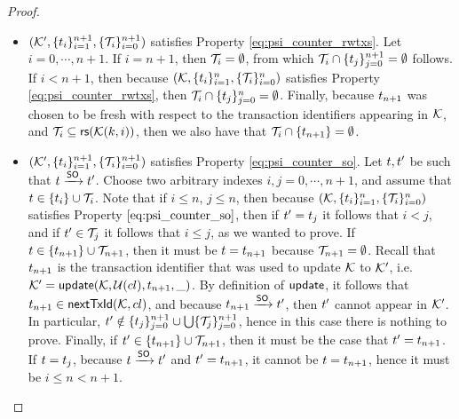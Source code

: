 \begin{proof}
\begin{itemize}
\begin{itemize}
\item $(\mathcal{K}', \{t_{i}\}_{i=1}^{n+1}, \{\mathcal{T}_{i}\}_{i=0}^{n+1})$ 
satisfies Property \eqref{eq:psi_counter_rwtxs}. Let $i =0, \cdots, n+1$. If $i = n+1$, then 
$\mathcal{T}_{i} = \emptyset$, from which $\mathcal{T}_{i} \cap \{t_{j}\}_{j=0}^{n+1} = \emptyset$ follows. If $i < n+1$, then 
because $(\mathcal{K}, \{t_{i}\}_{i=1}^{n}, \{\mathcal{T}_{i}\}_{i=0}^{n})$ 
satisfies Property \eqref{eq:psi_counter_rwtxs}, then $\mathcal{T}_{i} \cap \{t_{j}\}_{j=0}^{n} = \emptyset$. 
Finally, because $t_{n+1}$ was chosen to be fresh with respect to the transaction identifiers appearing in 
$\mathcal{K}$, and $\mathcal{T}_{i} \subseteq \mathsf{rs}(\mathcal{K}(k, i))$, then  we also have that $\mathcal{T}_{i} \cap \{t_{n+1}\} = \emptyset$. 
\item $(\mathcal{K}', \{t_{i}\}_{i=1}^{n+1}, \{\mathcal{T}_{i}\}_{i=0}^{n+1})$ satisfies Property \eqref{eq:psi_counter_so}. Let 
$t, t'$ be such that $t \xrightarrow{\mathsf{SO}} t'$. Choose two arbitrary indexes $i,j=0,\cdots, n+1$, 
and assume that $t \in \{t_{i}\} \cup \mathcal{T}_{i}$. Note that if $i \leq n$, $j \leq n$, then 
because $(\mathcal{K}, \{t_{i}\}_{i=1}^{n}, \{\mathcal{T}_{i}\}_{i=0}^{n})$ satisfies Property $\eqref{eq:psi_counter_so}$, then 
if $t' = t_{j}$ it follows that $i < j$, and if $t' \in \mathcal{T}_{j}$ it follows that $i \leq j$, as 
we wanted to prove. 
If $t \in \{t_{n+1}\} \cup \mathcal{T}_{n+1}$, then it must be $t = t_{n+1}$ because 
$\mathcal{T}_{n+1} = \emptyset$. Recall that $t_{n+1}$ is the transaction identifier that was used 
to update $\mathcal{K}$ to $\mathcal{K}'$, i.e. $\mathcal{K}' = \mathsf{update}(\mathcal{K}, \mathcal{U}({cl}), t_{n+1}, \_)$. By 
definition of $\mathsf{update}$, it follows that $t_{n+1} \in \mathsf{nextTxId}(\mathcal{K}, {cl})$, 
and because $t_{n+1} \xrightarrow{\mathsf{SO}} t'$, then $t'$ cannot appear in $\mathcal{K}'$. 
In particular, 
$t' \notin \{t_{j}\}_{j=0}^{n+1} \cup \bigcup \{\mathcal{T}_{j}\}_{j=0}^{n+1}$, hence in this case there is nothing to prove. 
Finally, if $t' \in \{t_{n+1}\} \cup \mathcal{T}_{n+1}$, then 
it must be the case that $t' = t_{n+1}$. If $t = t_{j}$, because 
$t \xrightarrow{\mathsf{SO}} t'$ and $t' = t_{n+1}$, it cannot be $t = t_{n+1}$, 
hence it must be $i \leq n < n+1$. 

\end{itemize}
\end{itemize}
\end{proof}
